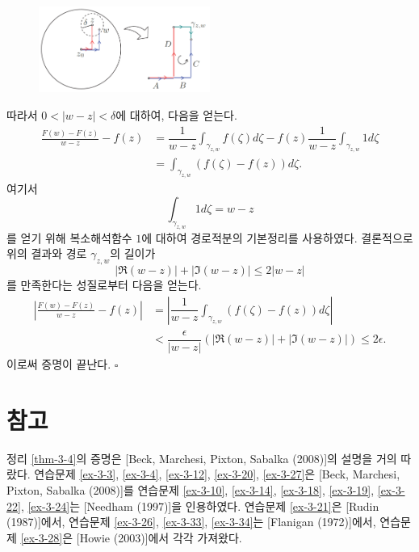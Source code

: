 \begin{figure}[h!]
\begin{center}
\includegraphics[width=0.5\textwidth]{./SaltChapter/figs/fig-3-0-13}
\end{center}
\end{figure}

따라서 $0<|w-z|<\delta$에 대하여, 다음을 얻는다.
\begin{align*}
\frac{F(w)-F(z)}{w-z} - f(z)
&= \dfrac1{w-z}\int_{\gamma_{z,w}} f(\zeta)d\zeta - f(z) \dfrac1{w-z}\int_{\gamma_{z,w}} 1 d\zeta \\ 
& = \int_{\gamma_{z,w}} (f(\zeta) - f(z)) d\zeta.
\end{align*}
여기서 
\[
\int_{\gamma_{z,w}} 1 d\zeta = w-z
\]
를 얻기 위해 복소해석함수 $1$에 대하여 경로적분의 기본정리를 사용하였다.
결론적으로 위의 결과와 경로 $\gamma_{z,w}$의 길이가
\[
|\Re(w-z)| + |\Im(w-z)| \le 2|w-z|
\]
를 만족한다는 성질로부터 다음을 얻는다.
\begin{align*}
\left| \frac{F(w)-F(z)}{w-z} - f(z) \right|
&= \left| \dfrac1{w-z} \int_{\gamma_{z,w}} (f(\zeta) - f(z)) d\zeta \right|  \\
&< \dfrac\epsilon{|w-z|} (|\Re(w-z)| + |\Im(w-z)|) \le 2\epsilon.
\end{align*}
이로써 증명이 끝난다.
\hfill $\square$

\section{참고}

정리 \ref{thm-3-4}의 증명은 [Beck, Marchesi, Pixton, Sabalka (2008)]의 설명을
거의 따랐다. 연습문제 \ref{ex-3-3}, \ref{ex-3-4}, \ref{ex-3-12}, \ref{ex-3-20}, \ref{ex-3-27}은
[Beck, Marchesi, Pixton, Sabalka (2008)]를
연습문제 \ref{ex-3-10}, \ref{ex-3-14}, \ref{ex-3-18}, \ref{ex-3-19}, \ref{ex-3-22}, \ref{ex-3-24}는
[Needham (1997)]을 인용하였다.
연습문제 \ref{ex-3-21}은 [Rudin (1987)]에서, 
연습문제 \ref{ex-3-26}, \ref{ex-3-33}, \ref{ex-3-34}는 [Flanigan (1972)]에서,
연습문제 \ref{ex-3-28}은 [Howie (2003)]에서 각각 가져왔다.

